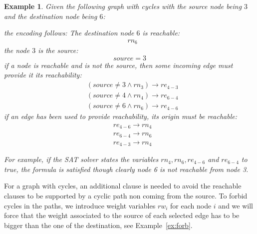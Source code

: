 \documentclass{report}
\theoremstyle{plain}
\newtheorem{example}{Example}[section]
\begin{document}
\begin{example}\label{ex:cycle}
Given the following graph with cycles with the source node being $3$ and the destination node being $6$:
\begin{center}
\end{center}
the encoding follows:
The destination node $6$ is reachable:
\begin{align*}
& rn_6
\end{align*}
the node $3$ is the source:
$$ 
source = 3
$$
if a node is reachable and is not the source, then some incoming edge must provide it its reachability:
\begin{align*}
& (source \neq 3 \wedge rn_3) \rightarrow re_{4-3} \\
& (source \neq 4 \wedge rn_4) \rightarrow re_{6-4}  \\
& (source \neq 6 \wedge rn_6) \rightarrow re_{4-6}
\end{align*}
if an edge has been used to provide reachability, its origin must be reachable:
\begin{align*}
& re_{4-6} \rightarrow rn_4 \\
& re_{6-4} \rightarrow rn_6 \\
& re_{4-3} \rightarrow rn_4
\end{align*}

For example, if the SAT solver states the variables $rn_4, rn_6, re_{4-6}$ and $re_{6-4}$ to true, the formula is satisfied though clearly node 6 is not reachable from node 3.
\end{example}

\vspace{1\baselineskip}

For a graph with cycles, an additional clause is needed to avoid the reachable clauses to be supported by a cyclic path non coming from the source.  To  forbid  cycles in the paths, we introduce weight variables $rw_i$ for each node $i$ and we will force that the weight associated to the source of each selected edge has to be bigger than the one of the destination, see Example~\ref{ex:forb}.
\end{document}
